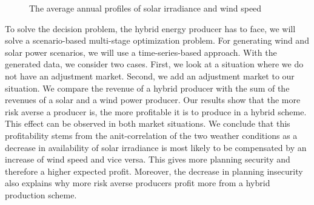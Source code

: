 	
\begin{figure}[h!]
	\centering
	
	\begin{minipage}{0.8\textwidth}
		\hfill
		
		\caption{The average annual profiles of solar irradiance and wind speed \cite{W11}}\label{fig:overyear}
	\end{minipage}	
\end{figure}
To solve the  decision problem, the hybrid energy producer has to face, we will solve a scenario-based multi-stage optimization problem. For generating wind and solar power scenarios, we will use a time-series-based approach. With the generated data, we consider two cases. First, we look at a situation where we do not have an adjustment market. Second, we add an adjustment market to our situation. We compare the revenue of a hybrid producer with the sum of the revenues of a solar and a wind power producer. Our results show that the more risk averse a producer is, the more profitable it is to produce in a hybrid scheme. This effect can be observed in both market situations. We conclude that this profitability stems from the anit-correlation of the two weather conditions as a decrease in availability of solar irradiance is most likely to be compensated by an increase of wind speed and vice versa. This gives more planning security and therefore a higher expected profit. Moreover, the decrease in planning insecurity also explains why more risk averse producers profit more from a hybrid production scheme.  

